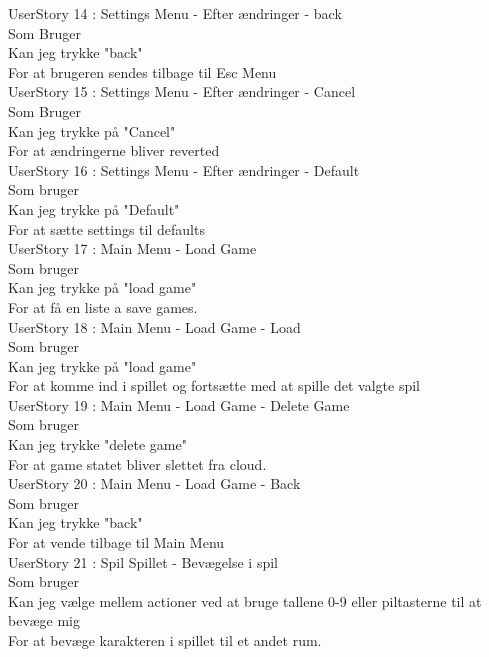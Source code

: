 UserStory 14 : Settings Menu - Efter ændringer - back\\
  Som Bruger \\
  Kan jeg trykke "back" \\
  For at brugeren sendes tilbage til Esc Menu\\

UserStory 15 : Settings Menu - Efter ændringer - Cancel\\
  Som Bruger \\
  Kan jeg trykke på "Cancel" \\
  For at ændringerne bliver reverted\\

UserStory 16 : Settings Menu - Efter ændringer - Default\\
  Som bruger \\
  Kan jeg trykke på "Default" \\
  For at sætte settings til defaults\\
  
UserStory 17 : Main Menu - Load Game\\
  Som bruger \\
  Kan jeg trykke på "load game" \\
  For at få en liste a save games.\\


UserStory 18 : Main Menu - Load Game - Load\\
  Som bruger \\
  Kan jeg trykke på "load game" \\
  For at komme ind i spillet og fortsætte med at spille det valgte spil\\

UserStory 19 : Main Menu - Load Game - Delete Game\\
  Som bruger \\
  Kan jeg trykke "delete game" \\
  For at game statet bliver slettet fra cloud.\\

UserStory 20 : Main Menu - Load Game - Back\\
  Som bruger \\
  Kan jeg trykke "back" \\
  For at vende tilbage til Main Menu\\
  
UserStory 21 : Spil Spillet - Bevægelse i spil\\
  Som bruger \\
  Kan jeg vælge mellem actioner ved at bruge tallene 0-9 eller piltasterne til at bevæge mig\\
  For at bevæge karakteren i spillet til et andet rum.\\

